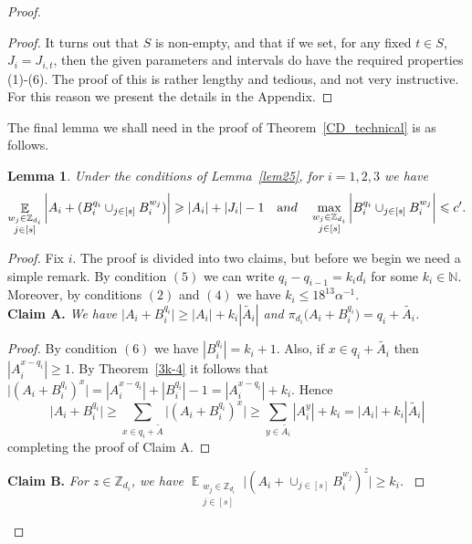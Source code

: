\documentclass[12pt,reqno]{amsart}
\DeclareMathOperator*{\E}{\mathbb{E}}
\newtheorem{lemma}[theorem]{Lemma}
\theoremstyle{definition}
\renewcommand\leq{\leqslant}
\renewcommand\geq{\geqslant}
\begin{document}
\begin{proof}
\begin{proof}
It turns out that $S$ is non-empty, and that if we set, for any fixed $t \in S$, $J_i = J_{i,t}$, then the given
parameters and intervals do have the required properties (1)-(6).  
The proof of this is rather lengthy and tedious, and not very instructive. For this reason we
present the details in the Appendix.
\end{proof}



\vspace{5pt}
The final lemma we shall need in the proof of Theorem~\ref{CD_technical} is as follows.
\begin{lemma}\label{lem30}
Under the conditions of Lemma~\ref{lem25}, for $i=1,2,3$ we have
\[
\E_{\substack{w_j \in \mathbb{Z}_{d_i} \\ j\in[s] }} \bigg|A_i+(B_i^{q_i}\cup_{j\in [s]} B_i^{w_j}) \bigg| \geq |A_i|+|J_i|-1 \ \ \ {\text and} \ \ \
\max_{\substack{w_j \in \mathbb{Z}_{d_i} \\ j\in[s] }} \bigg|B_i^{q_i}\cup_{j\in [s]} B_i^{w_j} \bigg| \leq c'.
\]
\end{lemma}
\begin{proof}
Fix $i$. The proof is divided into two claims, but before we begin we need a simple remark. By condition $(5)$ we can write $q_i-q_{i-1}=k_id_i$ for some $k_i\in \mathbb{N}$. Moreover, by conditions $(2)$ and $(4)$ we have $k_i \leq 18^{13}\alpha^{-1}$. \\



\vspace{7pt}
{\bf Claim A. }{\em We have $\bigg|A_i+B_i^{q_i}\bigg| \geq |A_i|+k_i|\widetilde{A_i}|$
and
$\pi_{d_i}\bigg(A_i+B_i^{q_i}\bigg)=q_i+\widetilde{A_i}$.
}
\begin{proof}
By condition $(6)$  we have $|B_i^{q_i}|=k_i+1$. Also, if $x\in q_i+ \widetilde{A_i}$   then $|A_i^{x-q_i}| \geq 1$.
By Theorem~\ref{3k-4} it follows that $\bigg| (A_i+B_i^{q_i})^x\bigg|= |A_i^{x-q_i}|+|B_i^{q_i}|-1 =|A_i^{x-q_i}|+k_i$.
Hence
\begin{equation*}\label{eq30.6}
\bigg|A_i+B_i^{q_i}\bigg| \geq \sum_{x\in q_i+\widetilde{A}} \bigg|(A_i+B_i^{q_i})^x\bigg| \geq \sum_{y\in \widetilde{A_i}} |A_i^y|+k_i = |A_i|+k_i|\widetilde{A_i}|
\end{equation*}
completing the proof of Claim A.
\end{proof}

\vspace{7pt}
{\bf Claim B. }{\em   For  $z\in \mathbb{Z}_{d_i}$, we have
$\E_{\substack{w_j \in \mathbb{Z}_{d_i} \\ j\in[s] }} \bigg|(A_i+\cup_{j\in [s]} B_i^{w_j})^z \bigg| \geq k_i$. }


\end{proof}
\end{proof}
\end{document}
